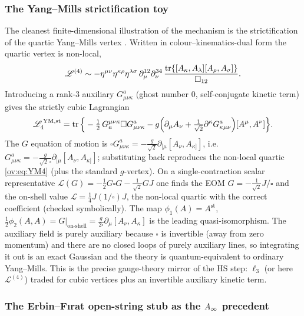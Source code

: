 \subsubsection{The Yang--Mills strictification toy}
\label{ov:sec:explicit:YM}

The cleanest finite-dimensional illustration of the mechanism is the strictification of the
quartic Yang--Mills vertex \cite{Borsten:2021:DoubleCopyHomotopy}. Written in colour--kinematics-dual form the
quartic vertex is non-local,
\begin{equation}
	\mathscr{L}^{(4)}\sim
	-\eta^{\mu\nu}\eta^{\kappa\rho}\eta^{\lambda\sigma}\,
	\partial^{12}_\mu\partial^{34}_\nu\,
	\frac{\operatorname{tr}\{[A_\kappa,A_\lambda][A_\rho,A_\sigma]\}}{\square_{12}}.
	\label{ov:eq:YM4}
\end{equation}
Introducing a rank-3 auxiliary $G^a_{\mu\nu\kappa}$ (ghost number $0$, self-conjugate kinetic
term) gives the strictly cubic Lagrangian
\begin{equation}
	\mathscr{L}^{\,\mathrm{YM,st}}_4 = \operatorname{tr}\Big\{
	-\tfrac12\,G^{\mu\nu\kappa}_a\square G^a_{\mu\nu\kappa}
	-g\Big(\partial_\mu A_\nu+\tfrac{1}{\sqrt2}\partial^\kappa G^a_{\kappa\mu\nu}\Big)
	[A^\mu,A^\nu]\Big\}.
	\label{ov:eq:YMst}
\end{equation}
The $G$ equation of motion is $\square G^a_{\mu\nu\kappa}=-\tfrac{g}{\sqrt2}\partial_{[\mu}
[A_\nu,A_{\kappa]}]$, i.e. $G^a_{\mu\nu\kappa}=-\tfrac{g}{\sqrt2\,\square}\partial_{[\mu}
[A_\nu,A_{\kappa]}]$; substituting back reproduces the non-local quartic \eqref{ov:eq:YM4} (plus
the standard $g$-vertex). On a single-contraction scalar representative
$\mathscr{L}(G)=-\tfrac12 G\square G-\tfrac{1}{\sqrt2}GJ$ one finds the EOM
$G=-\tfrac{1}{\sqrt2}J/\square$ and the on-shell value $\mathscr{L}=\tfrac14 J(1/\square)J$, the
non-local quartic with the correct coefficient (checked symbolically). The map
$\phi_1(A)=A^{\mathrm{st}}$, $\tfrac12\phi_2(A,A)=G|_{\text{on-shell}}=
\tfrac{g}{2\square}\partial_\mu[A_\nu,A_\kappa]$ is the leading quasi-isomorphism. The auxiliary
field is purely auxiliary because $\square$ is invertible (away from zero momentum) and there
are no closed loops of purely auxiliary lines, so integrating it out is an exact Gaussian and
the theory is quantum-equivalent to ordinary Yang--Mills. This is the precise gauge-theory
mirror of the HS step: $\ell_3$ (or here $\mathscr{L}^{(4)}$) traded for cubic vertices plus an
invertible auxiliary kinetic term.

\subsubsection{The Erbin--F{\i}rat open-string stub as the \texorpdfstring{$A_\infty$}{A-infinity}
precedent}
\label{ov:sec:explicit:stub}

